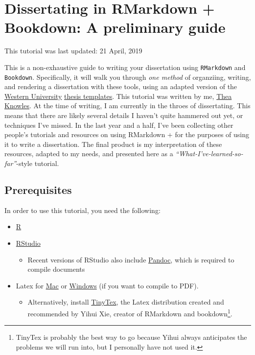 \documentclass[
  12pt,
  oneside]{book}
\providecommand{\tightlist}{%
  \setlength{\itemsep}{0pt}\setlength{\parskip}{0pt}}
\numberwithin{figure}{chapter}
\begin{document}
\mainmatter
\hypertarget{dissertating-in-rmarkdown-bookdown-a-preliminary-guide}{%
\chapter{Dissertating in RMarkdown + Bookdown: A preliminary guide}\label{dissertating-in-rmarkdown-bookdown-a-preliminary-guide}}

This tutorial was last updated: 21 April, 2019

This is a non-exhaustive guide to writing your dissertation using \texttt{RMarkdown} and \texttt{Bookdown}.
Specifically, it will walk you through \emph{one method} of organziing, writing, and rendering a dissertation with these tools, using an adapted version of the \href{uwo.ca}{Western University} \href{https://grad.uwo.ca/academics/thesis/formatting.html}{thesis templates}.
This tutorial was written by me, \href{theaknowles.com}{Thea Knowles}. At the time of writing, I am currently in the throes of dissertating. This means that there are likely several details I haven't quite hammered out yet, or techniques I've missed. In the last year and a half, I've been collecting other people's tutorials and resources on using RMarkdown + for the purposes of using it to write a dissertation. The final product is my interpretation of these resources, adapted to my needs, and presented here as a \emph{``What-I've-learned-so-far''}-style tutorial.

\hypertarget{prerequisites}{%
\section{Prerequisites}\label{prerequisites}}

In order to use this tutorial, you need the following:

\begin{itemize}
\tightlist
\item
  \href{https://www.r-project.org/}{R}
\item
  \href{https://www.rstudio.com/products/rstudio/download/}{RStudio}

  \begin{itemize}
  \tightlist
  \item
    Recent versions of RStudio also include \href{}{Pandoc}, which is required to compile documents
  \end{itemize}
\item
  Latex for \href{https://tug.org/mactex/mactex-download.html}{Mac} or \href{https://miktex.org/download}{Windows} (if you want to compile to PDF).

  \begin{itemize}
  \tightlist
  \item
    Alternatively, install \href{https://yihui.name/tinytex/}{TinyTex}, the Latex distribution created and recommended by Yihui Xie, creator of RMarkdown and bookdown\footnote{TinyTex is probably the best way to go because Yihui always anticipates the problems we will run into, but I personally have not used it.}.
  \end{itemize}
\end{itemize}
\end{document}
